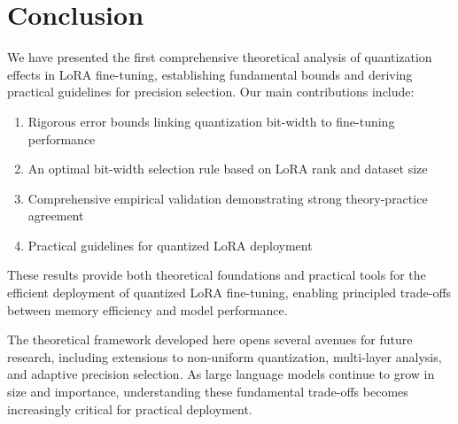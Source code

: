 \documentclass[10pt,twocolumn]{article}
\begin{document}
\section{Conclusion}

We have presented the first comprehensive theoretical analysis of quantization effects in LoRA fine-tuning, establishing fundamental bounds and deriving practical guidelines for precision selection. Our main contributions include:

\begin{enumerate}
\item Rigorous error bounds linking quantization bit-width to fine-tuning performance
\item An optimal bit-width selection rule based on LoRA rank and dataset size  
\item Comprehensive empirical validation demonstrating strong theory-practice agreement
\item Practical guidelines for quantized LoRA deployment
\end{enumerate}

These results provide both theoretical foundations and practical tools for the efficient deployment of quantized LoRA fine-tuning, enabling principled trade-offs between memory efficiency and model performance.

The theoretical framework developed here opens several avenues for future research, including extensions to non-uniform quantization, multi-layer analysis, and adaptive precision selection. As large language models continue to grow in size and importance, understanding these fundamental trade-offs becomes increasingly critical for practical deployment.



\end{document}
